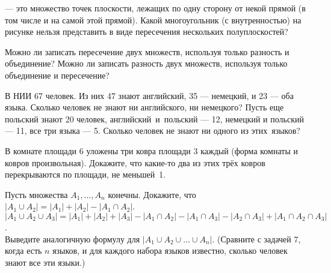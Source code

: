 \documentclass[a4paper,11pt]{article}
\newcommand{\regionB}[1]
{   \fill[#1] (30:2) arc (60:0:{2*sqrt(3)}) arc (-60:120:{2*sqrt(3)}) arc (60:0:{2*sqrt(3)});
}
\newcommand{\regionA}[1]
{   \fill[#1] (150:2) arc (180:120:{2*sqrt(3)}) arc (60:240:{2*sqrt(3)}) arc (180:120:{2*sqrt(3)});
}
\newcommand{\regionC}[1]
{   \fill[#1] (270:2) arc (240:300:{2*sqrt(3)}) arc (360:180:{2*sqrt(3)}) arc (240:300:{2*sqrt(3)});
}
\newcommand{\regionAB}[1]
{   \fill[#1] (30:2) arc (0:60:{2*sqrt(3)}) arc (120:180:{2*sqrt(3)}) arc (120:60:{2*sqrt(3)});
}
\newcommand{\regionBC}[1]
{   \fill[#1] (30:2) arc (60:0:{2*sqrt(3)}) arc (300:240:{2*sqrt(3)}) arc (-60:0:{2*sqrt(3)});
}
\newcommand{\regionAC}[1]
{   \fill[#1] (150:2) arc (120:180:{2*sqrt(3)}) arc (240:300:{2*sqrt(3)}) arc (240:180:{2*sqrt(3)});
}
\newcommand{\regionABC}[1]
{   \fill[#1] (30:2) arc (60:120:{2*sqrt(3)}) arc (180:240:{2*sqrt(3)}) arc (-60:0:{2*sqrt(3)});
}
\newcommand{\mycolor}{blue!50!cyan}
\newcommand{\mynocolor}{white}
\begin{document}
\begin{tikzpicture}[scale=0.16]
 \end{tikzpicture} \quad {}

 --- это множество точек плоскости, лежащих
по одну сторону от некой прямой (в том числе и на самой этой прямой).
Какой многоугольник (с внутренностью) на рисунке нельзя
представить в виде пересечения нескольких полуплоскостей?


\vspace*{-.4cm}
 Можно ли записать пересечение двух множеств, используя только разность и объединение?
 Можно ли записать разность двух множеств, используя только
объединение и пересечение?


 В НИИ 67 человек. Из них
47 знают английский, 35 --- немецкий, и 23 --- оба языка.
Сколько человек не знают ни английского, ни немецкого?
 Пусть еще  польский
знают 20 человек, английский~и~поль\-с\-кий --- 12, немецкий и
польский --- 11, все три языка --- 5.
Сколько человек не знают ни одного из этих~языков?

 В комнате площади 6 уложены три ковра площади 3 каждый (форма комнаты и ковров произвольная).
Докажите, что какие-то два из этих трёх ковров перекрываются по площади, не меньшей~1.

Пусть множества $A_1,\dots,A_n$ конечны. Докажите, что
  $|A_1\cup A_2|=|A_1|+|A_2|-|A_1\cap A_2|$.\\
$|A_1\cup A_2\cup A_3|=|A_1|+|A_2|+|A_3|-|A_1\cap A_2|-|A_1\cap A_3|-
|A_2\cap A_3|+|A_1\cap A_2\cap A_3|$.\\
Выведите аналогичную формулу для $|A_1\cup A_2\cup\dots\cup A_n|$.
(Сравните с задачей 7, когда есть $n$ языков,
и для каждого набора языков известно, сколько человек знают все эти языки.)
\end{document}
